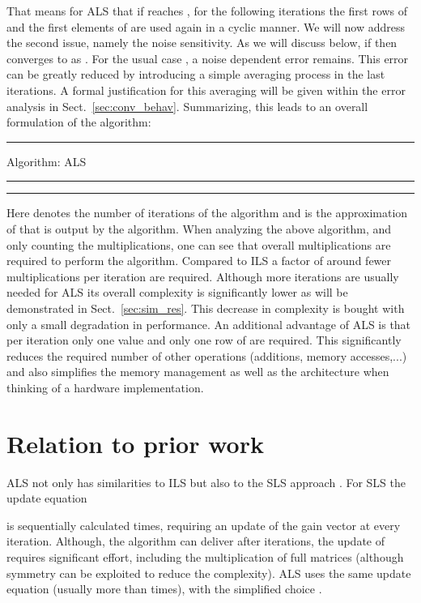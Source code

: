 \documentclass{article}
\begin{document}
That means for ALS that if  reaches , for the following iterations the first rows of  and the first 
elements of  are used again in a cyclic manner. 
We will now address the second issue, namely the noise sensitivity. 
As we will discuss below, if  then  
converges to  as . For the usual case
, a noise dependent error remains. This
error can be greatly reduced by introducing a simple averaging 
process in the last  iterations. A formal 
justification for this averaging will be given within the error analysis 
in Sect.~\ref{sec:conv_behav}. 
Summarizing, this leads to an overall formulation of the algorithm: \\ 
\clearpage
{}\smallskipamount
\noindent \rule{\columnwidth}{.4pt}
\smallskipamount
\noindent Algorithm: ALS\\
\smallskipamount
\noindent \rule{\columnwidth}{.4pt}
\begin{algorithmic}                    
\State 
\State 
\For {}
\State 
\If {}
\State 
\EndIf
\EndFor
\State 
\end{algorithmic}
\smallskipamount
\noindent \rule{\columnwidth}{.4pt}
Here  denotes the number of iterations of the algorithm and 
 is the approximation of  
that is output by the algorithm.
When analyzing the above algorithm, and only counting the multiplications, one can 
see that  overall multiplications are required to perform the algorithm. 
Compared to ILS a factor of around  fewer multiplications per 
iteration are required. 
Although more iterations are usually needed for ALS  
its overall complexity is significantly lower
as will be demonstrated in Sect.~\ref{sec:sim_res}.
This decrease in complexity is bought with only a 
small degradation in performance. An additional advantage of ALS is 
that per iteration only one value  and only one row 
 of  are required. 
This significantly 
reduces the required number of other operations (additions,
memory accesses,...) and also simplifies the memory management as well 
as the architecture when thinking of a hardware implementation.
\section{Relation to prior work}  
\label{sec:prior} 
ALS not only has similarities to ILS but also to the SLS approach \cite{kay}.
For SLS the update equation

is sequentially calculated  times, requiring an update of the gain vector 
 at every iteration.
Although, the algorithm can deliver  after  iterations, 
the update 
of  requires significant effort, including the multiplication of full 
matrices (although symmetry can be exploited
to reduce the complexity). ALS uses the same update equation 
(usually more than  times),
with the simplified choice .
\end{document}
